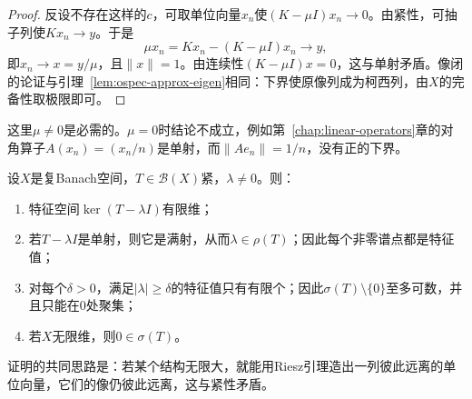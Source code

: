\begin{proof}
反设不存在这样的$c$，可取单位向量$x_n$使$(K-\mu I)x_n\to0$。由紧性，可抽子列使$Kx_n\to y$。于是
\[
\mu x_n=Kx_n-(K-\mu I)x_n\to y,
\]
即$x_n\to x=y/\mu$，且$\lVert x\rVert=1$。由连续性$(K-\mu I)x=0$，这与单射矛盾。像闭的论证与引理~\ref{lem:ospec-approx-eigen}相同：下界使原像列成为柯西列，由$X$的完备性取极限即可。
\end{proof}

这里$\mu\neq0$是必需的。$\mu=0$时结论不成立，例如第~\ref{chap:linear-operators}章的对角算子$A(x_n)=(x_n/n)$是单射，而$\lVert Ae_n\rVert=1/n$，没有正的下界。

\begin{theorem}[紧算子的非零谱]
\label{thm:ospec-compact-spectrum}
设$X$是复Banach空间，$T\in\mathcal B(X)$紧，$\lambda\neq0$。则：
\begin{enumerate}
\item 特征空间$\ker(T-\lambda I)$有限维；
\item 若$T-\lambda I$是单射，则它是满射，从而$\lambda\in\rho(T)$；因此每个非零谱点都是特征值；
\item 对每个$\delta>0$，满足$\lvert\lambda\rvert\geq\delta$的特征值只有有限个；因此$\sigma(T)\setminus\{0\}$至多可数，并且只能在$0$处聚集；
\item 若$X$无限维，则$0\in\sigma(T)$。
\end{enumerate}
\end{theorem}

证明的共同思路是：若某个结构无限大，就能用Riesz引理造出一列彼此远离的单位向量，它们的像仍彼此远离，这与紧性矛盾。

